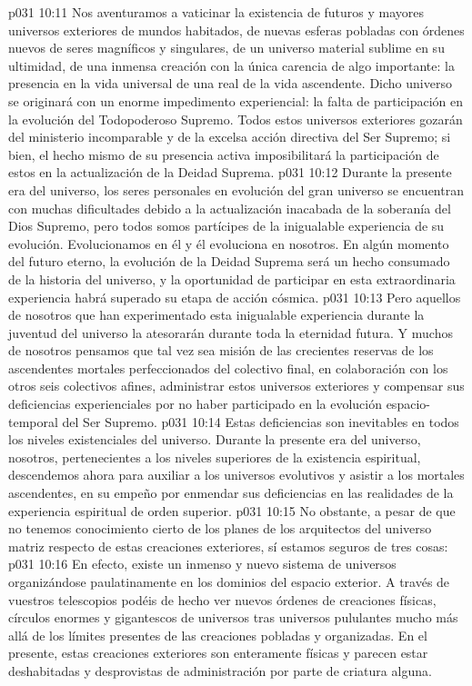 \vs p031 10:11 Nos aventuramos a vaticinar la existencia de futuros y mayores universos exteriores de mundos habitados, de nuevas esferas pobladas con órdenes nuevos de seres magníficos y singulares, de un universo material sublime en su ultimidad, de una inmensa creación con la única carencia de algo importante: la presencia en la vida universal de una  real de la vida ascendente. Dicho universo se originará con un enorme impedimento experiencial: la falta de participación en la evolución del Todopoderoso Supremo. Todos estos universos exteriores gozarán del ministerio incomparable y de la excelsa acción directiva del Ser Supremo; si bien, el hecho mismo de su presencia activa imposibilitará la participación de estos en la actualización de la Deidad Suprema.
\vs p031 10:12 Durante la presente era del universo, los seres personales en evolución del gran universo se encuentran con muchas dificultades debido a la actualización inacabada de la soberanía del Dios Supremo, pero todos somos partícipes de la inigualable experiencia de su evolución. Evolucionamos en él y él evoluciona en nosotros. En algún momento del futuro eterno, la evolución de la Deidad Suprema será un hecho consumado de la historia del universo, y la oportunidad de participar en esta extraordinaria experiencia habrá superado su etapa de acción cósmica.
\vs p031 10:13 Pero aquellos de nosotros que han experimentado esta inigualable experiencia durante la juventud del universo la atesorarán durante toda la eternidad futura. Y muchos de nosotros pensamos que tal vez sea misión de las crecientes reservas de los ascendentes mortales perfeccionados del colectivo final, en colaboración con los otros seis colectivos afines, administrar estos universos exteriores y compensar sus deficiencias experienciales por no haber participado en la evolución espacio\hyp{}temporal del Ser Supremo.
\vs p031 10:14 Estas deficiencias son inevitables en todos los niveles existenciales del universo. Durante la presente era del universo, nosotros, pertenecientes a los niveles superiores de la existencia espiritual, descendemos ahora para auxiliar a los universos evolutivos y asistir a los mortales ascendentes, en su empeño por enmendar sus deficiencias en las realidades de la experiencia espiritual de orden superior.
\vs p031 10:15 No obstante, a pesar de que no tenemos conocimiento cierto de los planes de los arquitectos del universo matriz respecto de estas creaciones exteriores, sí estamos seguros de tres cosas:
\vs p031 10:16 En efecto, existe un inmenso y nuevo sistema de universos organizándose paulatinamente en los dominios del espacio exterior. A través de vuestros telescopios podéis de hecho ver nuevos órdenes de creaciones físicas, círculos enormes y gigantescos de universos tras universos pululantes mucho más allá de los límites presentes de las creaciones pobladas y organizadas. En el presente, estas creaciones exteriores son enteramente físicas y parecen estar deshabitadas y desprovistas de administración por parte de criatura alguna.
